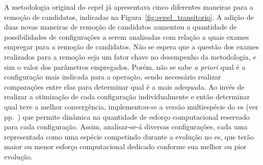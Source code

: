 A metodologia original do \acs{cepel} já apresentava cinco diferentes
maneiras para a remoção de candidatos, indicadas na
Figura~\ref{fig:cepel_transitorio}. A adição de duas novas maneiras de
remoção de candidatos aumentou a quantidade de possibilidades de
configurações a serem analisadas com relação a quais exames empregar
para a remoção de candidatos. Não se espera que a questão dos exames
realizados para a remoção seja um fator chave no desempenho da
metodologia, e sim o valor dos parâmetros empregados. Porém, não se sabe
\emph{a priori} qual é a configuração mais indicada para a operação,
sendo necessário realizar comparações entre elas para determinar qual
é a mais adequada. Ao invés de realizar a otimização de cada
configuração individualmente e então determinar qual teve a melhor
convergência, implementou-se a versão multiespécie do \acs{es} (ver
pp.~\pageref{sssec:multiespecie}) que
permite dinâmica na quantidade de esforço computacional reservado para
cada configuração. Assim, analisar-se-á diversas configurações, cada
uma representada como uma espécie competindo durante a evolução no
\acs{es}, que terão maior ou menor esforço computacional dedicado
conforme sua melhor ou pior evolução.


